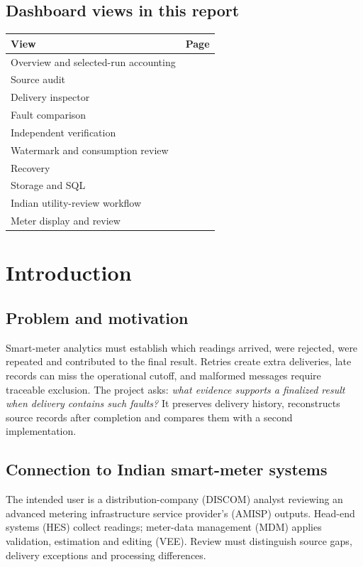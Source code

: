 \documentclass[11pt,a4paper]{article}
\begin{document}
\subsection*{Dashboard views in this report}
\begin{tabularx}{\linewidth}{@{}Xr@{}}\toprule
\textbf{View} & \textbf{Page}\\\midrule
Overview and selected-run accounting & \pageref{fig:overview}\\
Source audit & \pageref{fig:source}\\
Delivery inspector & \pageref{fig:layers}\\
Fault comparison & \pageref{fig:faults}\\
Independent verification & \pageref{fig:verification}\\
Watermark and consumption review & \pageref{fig:watermark}\\
Recovery & \pageref{fig:recovery}\\
Storage and SQL & \pageref{fig:storage}\\
Indian utility-review workflow & \pageref{fig:india}\\
Meter display and review & \pageref{fig:meter-demo}\\\bottomrule
\end{tabularx}
\clearpage
\FloatBarrier
\section{Introduction}
\subsection{Problem and motivation}
Smart-meter analytics must establish which readings arrived, were rejected, were repeated and contributed to the final result. Retries create extra deliveries, late records can miss the operational cutoff, and malformed messages require traceable exclusion. The project asks: \emph{what evidence supports a finalized result when delivery contains such faults?} It preserves delivery history, reconstructs source records after completion and compares them with a second implementation.

\subsection{Connection to Indian smart-meter systems}
The intended user is a distribution-company (DISCOM) analyst reviewing an advanced metering infrastructure service provider's (AMISP) outputs. Head-end systems (HES) collect readings; meter-data management (MDM) applies validation, estimation and editing (VEE). Review must distinguish source gaps, delivery exceptions and processing differences.
\end{document}
